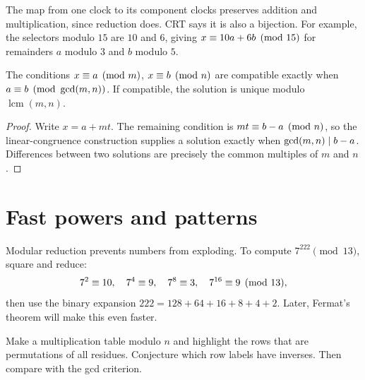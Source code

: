 \begin{center}
\end{center}

The map from one clock to its component clocks preserves addition and
multiplication, since reduction does. CRT says it is also a bijection.
For example, the selectors modulo $15$ are $10$ and $6$, giving
$x\equiv10a+6b\pmod{15}$ for remainders $a$ modulo $3$ and $b$ modulo $5$.

\begin{proposition}
The conditions $x\equiv a\pmod m$, $x\equiv b\pmod n$ are compatible
exactly when $a\equiv b\pmod{\gcd(m,n)}$. If compatible, the solution is
unique modulo $\operatorname{lcm}(m,n)$.
\end{proposition}
\begin{proof}
Write $x=a+mt$. The remaining condition is $mt\equiv b-a\pmod n$,
so the linear-congruence construction supplies a solution exactly when
$\gcd(m,n)\mid b-a$. Differences between two solutions are precisely
the common multiples of $m$ and $n$.
\end{proof}



\section{Fast powers and patterns}

Modular reduction prevents numbers from exploding. To compute $7^{222}\pmod{13}$, square and reduce:
\[
7^2\equiv10,\quad 7^4\equiv9,\quad7^8\equiv3,\quad7^{16}\equiv9\pmod{13},
\]
then use the binary expansion $222=128+64+16+8+4+2$. Later, Fermat's theorem will make this even faster.

\begin{labbox}
Make a multiplication table modulo $n$ and highlight the rows that are permutations of all residues. Conjecture which row labels have inverses. Then compare with the gcd criterion.
\end{labbox}

